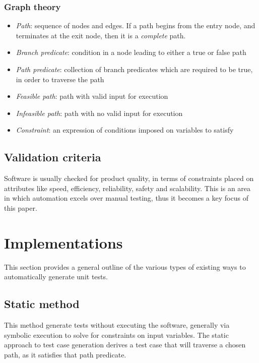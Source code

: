 \documentclass{icldt}
\numberwithin{equation}{section}       %
\begin{document}
\subsubsection{Graph theory}
\begin{itemize}
	\item \emph{Path}: sequence of nodes and edges. If a path begins from the entry node, and terminates at the exit node, then it is a \emph{complete} path.
	\item \emph{Branch predicate}: condition in a node leading to either a true or false path
	\item \emph{Path predicate}: collection of branch predicates which are required to be true, in order to traverse the path
	\item \emph{Feasible path}: path with valid input for execution
	\item \emph{Infeasible path}: path with no valid input for execution
	\item \emph{Constraint}: an expression of conditions imposed on variables to satisfy
\end{itemize}
\subsection{Validation criteria}
Software is usually checked for product quality, in terms of constraints placed on attributes like speed, efficiency, reliability, safety and scalability. This is an area in which automation excels over manual testing, thus it becomes a key focus of this paper.
\section{Implementations}

This section provides a general outline of the various types of existing ways to automatically generate unit tests.

\subsection{Static method}
This method generate tests without executing the software, generally via symbolic execution to solve for constraints on input variables. The static approach to test case generation derives a test case that will traverse a chosen path, as it satisfies that path predicate.
\end{document}

